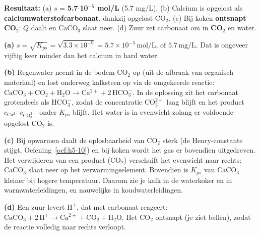 \begin{oplossing}
\textbf{Resultaat:} (a) \(s\) = \textbf{5.7\ensuremath{\cdot{}}10\ensuremath{^{-5}} mol/L} (5.7 mg/L). (b) Calcium is opgelost als \textbf{calciumwaterstofcarbonaat}, dankzij opgelost CO\ensuremath{_{2}}. (c) Bij koken \textbf{ontsnapt CO\ensuremath{_{2}}}: \(Q\) daalt en CaCO\ensuremath{_{3}} slaat neer. (d) Zuur zet carbonaat om in \textbf{CO\ensuremath{_{2}}} en water.

\textbf{(a)} \(s = \sqrt{K_{ps}} = \sqrt{3.3\times10^{-9}} = 5.7\times10^{-5}\,\mathrm{mol/L}\), of \(5.7\,\mathrm{mg/L}\). Dat is ongeveer vijftig keer minder dan het calcium in hard water.

\textbf{(b)} Regenwater neemt in de bodem \(\mathrm{CO_2}\) op (uit de afbraak van organisch materiaal) en lost onderweg kalksteen op via de omgekeerde reactie: \(\mathrm{CaCO_3 + CO_2 + H_2O \rightarrow Ca^{2+} + 2\,HCO_3^-}\). In de oplossing zit het carbonaat grotendeels als \(\mathrm{HCO_3^-}\), zodat de concentratie \(\mathrm{CO_3^{2-}}\) laag blijft en het product \(c_{\mathrm{Ca^{2+}}}c_{\mathrm{CO_3^{2-}}}\) onder \(K_{ps}\) blijft. Het water is in evenwicht zolang er voldoende opgelost \(\mathrm{CO_2}\) is.

\textbf{(c)} Bij opwarmen daalt de oplosbaarheid van \(\mathrm{CO_2}\) sterk (de Henry-constante stijgt, Oefening~\ref{oef:h5-10}) en bij koken wordt het gas er bovendien uitgedreven. Het verwijderen van een product (\(\mathrm{CO_2}\)) verschuift het evenwicht naar rechts: \(\mathrm{CaCO_3}\) slaat neer op het verwarmingselement. Bovendien is \(K_{ps}\) van \(\mathrm{CaCO_3}\) kleiner bij hogere temperatuur. Daarom zie je kalk in de waterkoker en in warmwaterleidingen, en nauwelijks in koudwaterleidingen.

\textbf{(d)} Een zuur levert \(\mathrm{H^+}\), dat met carbonaat reageert: \(\mathrm{CaCO_3 + 2\,H^+ \rightarrow Ca^{2+} + CO_2 + H_2O}\). Het \(\mathrm{CO_2}\) ontsnapt (je ziet bellen), zodat de reactie volledig naar rechts verloopt.
\end{oplossing}

